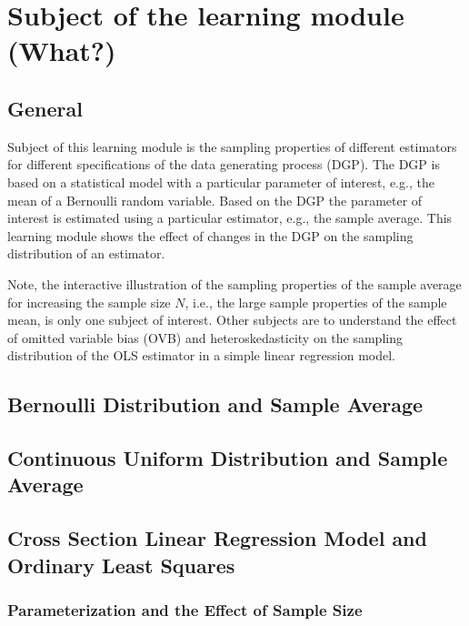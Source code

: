\documentclass{article}
\begin{document}
\section{Subject of the learning module (What?)}

\subsection{General}

Subject of this learning module is the sampling properties of different estimators for different specifications of the data generating process (DGP). 
%
The DGP is based on a statistical model with a particular parameter of interest, e.g., the mean of a Bernoulli random variable. 
%
Based on the DGP the parameter of interest is estimated using a particular estimator, e.g., the sample average. 
%
This learning module shows the effect of changes in the DGP on the sampling distribution of an estimator.  

Note, the interactive illustration of the sampling properties of the sample average for increasing the sample size $N$, i.e., the large sample properties of the sample mean, is only one subject of interest. 
%
Other subjects are to understand the effect of omitted variable bias (OVB) and heteroskedasticity on the sampling distribution of the OLS estimator in a simple linear regression model.

\subsection{Bernoulli Distribution and Sample Average}


\subsection{Continuous Uniform Distribution and Sample Average}


\subsection{Cross Section Linear Regression Model and Ordinary Least Squares}

\subsubsection{Parameterization and the Effect of Sample Size}
\end{document}
